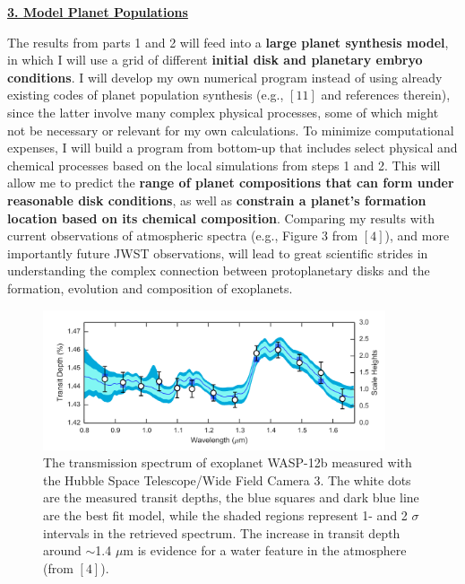 \documentclass[12pt, letterpaper]{article}
\begin{document}
\vspace{0.2in}

\underline{\textbf{3. Model Planet Populations}}

The results from parts 1 and 2 will feed into a \textbf{large planet synthesis model}, in which I will use a grid of different \textbf{initial disk and planetary embryo conditions}. I will develop my own numerical program instead of using already existing codes of planet population synthesis (e.g., $[11]$ and references therein), since the latter involve many complex physical processes, some of which might not be necessary or relevant for my own calculations. To minimize computational expenses, I will build a program from bottom-up that includes select physical and chemical processes based on the local simulations from steps 1 and 2. This will allow me to predict the \textbf{range of planet compositions that can form under reasonable disk conditions}, as well as \textbf{constrain a planet's formation location based on its chemical composition}. Comparing my results with current observations of atmospheric spectra (e.g., Figure 3 from $[4]$), and more importantly future JWST observations, will lead to great scientific strides in understanding the complex connection between protoplanetary disks and the formation, evolution and composition of exoplanets. 

\begin{figure}[h!]
\centering
\vspace{-0.2in}
\includegraphics[width=0.9\textwidth]{water_spectrum}
\vspace{-0.2in}
\caption{The transmission spectrum of exoplanet WASP-12b measured with the Hubble Space Telescope/Wide Field Camera 3. The white dots are the measured transit depths, the blue squares and dark blue line are the best fit model, while the shaded regions represent 1- and 2 $\sigma$ intervals in the retrieved spectrum. The increase in transit depth around $\sim$1.4 $\mu$m is evidence for a water feature in the atmosphere (from $[4]$).}
\label{fig:HLTau}
\end{figure}
\end{document}
